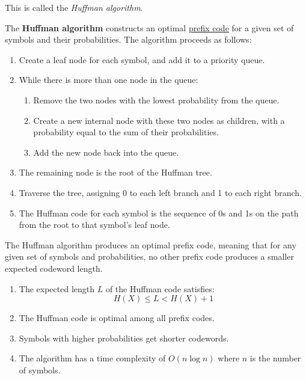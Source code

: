     This is called the \textit{Huffman algorithm}. 

    \begin{theorem}
      \label{thm:huffman-algorithm}
      The \textbf{Huffman algorithm} constructs an optimal \hyperref[def:prefix-code]{prefix code} for a given set of symbols and their probabilities. The algorithm proceeds as follows:

      \begin{enumerate}
        \item Create a leaf node for each symbol, and add it to a priority queue.
        \item While there is more than one node in the queue:
        \begin{enumerate}
          \item Remove the two nodes with the lowest probability from the queue.
          \item Create a new internal node with these two nodes as children, with a probability equal to the sum of their probabilities.
          \item Add the new node back into the queue.
        \end{enumerate}
        \item The remaining node is the root of the Huffman tree.
        \item Traverse the tree, assigning 0 to each left branch and 1 to each right branch.
        \item The Huffman code for each symbol is the sequence of 0s and 1s on the path from the root to that symbol's leaf node.
      \end{enumerate}

      The Huffman algorithm produces an optimal prefix code, meaning that for any given set of symbols and probabilities, no other prefix code produces a smaller expected codeword length.
      \begin{enumerate}
        \item The expected length $L$ of the Huffman code satisfies:
        \begin{equation}
          H(X) \leq L < H(X) + 1
        \end{equation}
        \item The Huffman code is optimal among all prefix codes.
        \item Symbols with higher probabilities get shorter codewords.
        \item The algorithm has a time complexity of $O(n \log n)$ where $n$ is the number of symbols.
      \end{enumerate}
    \end{theorem}

